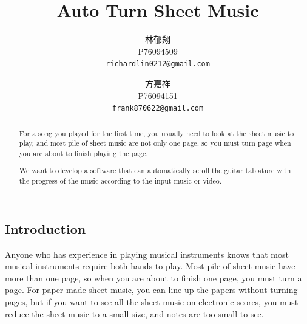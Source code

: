 \documentclass[10pt,twocolumn,letterpaper]{article}
\begin{document}
\begin{CJK}{UTF8}{bsmi}

\title{Auto Turn Sheet Music}

\author{林郁翔\\
P76094509\\
{\tt\small richardlin0212@gmail.com}
\and
方嘉祥\\
P76094151\\
{\tt\small frank870622@gmail.com}
}

\maketitle

\begin{abstract}
   For a song you played for the first time, you usually need to look at the sheet music to play, and most pile of sheet music are not only one page, so you must turn page when you are about to finish playing the page.

   We want to develop a software that can automatically scroll the guitar tablature with the progress of the music according to the input music or video.
\end{abstract}

\section{Introduction}

Anyone who has experience in playing musical instruments knows that most musical instruments require both hands to play. 
Most pile of sheet music have more than one page, so when you are about to finish one page, you must turn a page. 
For paper-made sheet music, you can line up the papers without turning pages, but if you want to see all the sheet music on electronic scores, you must reduce the sheet music to a small size, and notes are too small to see.



\end{CJK}
\end{document}
